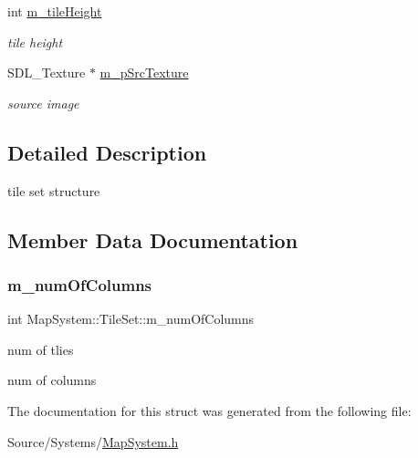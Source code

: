 \begin{DoxyCompactItemize}
\mbox{\label{struct_map_system_1_1_tile_set_a727921932e5d8f18151c2ae11646f4e6}} 
int \mbox{\hyperlink{struct_map_system_1_1_tile_set_a727921932e5d8f18151c2ae11646f4e6}{m\+\_\+tile\+Height}}
\begin{DoxyCompactList}\small\item\em tile height \end{DoxyCompactList}\item 
\mbox{\label{struct_map_system_1_1_tile_set_a6c1f6a90571061868e915b2fa2f60ef2}} 
S\+D\+L\+\_\+\+Texture $\ast$ \mbox{\hyperlink{struct_map_system_1_1_tile_set_a6c1f6a90571061868e915b2fa2f60ef2}{m\+\_\+p\+Src\+Texture}}
\begin{DoxyCompactList}\small\item\em source image \end{DoxyCompactList}\end{DoxyCompactItemize}


\subsection{Detailed Description}
tile set structure 

\subsection{Member Data Documentation}
\mbox{\label{struct_map_system_1_1_tile_set_a1c67e4f5e20a8cc2d87523cf772c8ee7}} 
\subsubsection{\texorpdfstring{m\+\_\+num\+Of\+Columns}{m\_numOfColumns}}
{\footnotesize\ttfamily int Map\+System\+::\+Tile\+Set\+::m\+\_\+num\+Of\+Columns}



num of tlies 

num of columns 

The documentation for this struct was generated from the following file\+:\begin{DoxyCompactItemize}
\item 
Source/\+Systems/\mbox{\hyperlink{_map_system_8h}{Map\+System.\+h}}\end{DoxyCompactItemize}
